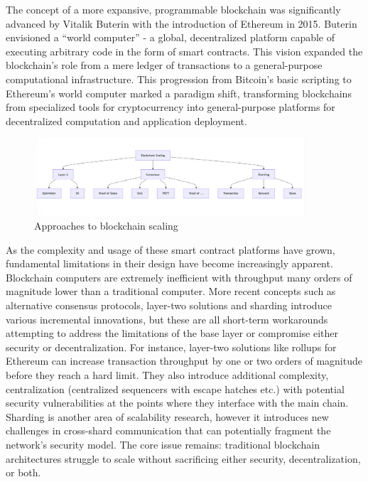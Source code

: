 \documentclass{article}
\begin{document}
The concept of a more expansive, programmable blockchain was significantly advanced by Vitalik Buterin with the introduction of Ethereum in 2015. Buterin envisioned a ``world computer'' - a global, decentralized platform capable of executing arbitrary code in the form of smart contracts. This vision expanded the blockchain's role from a mere ledger of transactions to a general-purpose computational infrastructure. This progression from Bitcoin's basic scripting to Ethereum's world computer marked a paradigm shift, transforming blockchains from specialized tools for cryptocurrency into general-purpose platforms for decentralized computation and application deployment.

\begin{figure}[H]
    \centering
    \includegraphics[width=0.9\textwidth]{scaling.png}
    \caption{Approaches to blockchain scaling}
    \label{fig:scaling}
\end{figure}


As the complexity and usage of these smart contract platforms have grown, fundamental limitations in their design have become increasingly apparent. Blockchain computers are extremely inefficient with throughput many orders of magnitude lower than a traditional computer. More recent concepts such as alternative consensus protocols, layer-two solutions and sharding introduce various incremental innovations, but these are all short-term workarounds attempting to address the limitations of the base layer or compromise either security or decentralization. For instance, layer-two solutions like rollups for Ethereum can increase transaction throughput by one or two orders of magnitude before they reach a hard limit. They also introduce additional complexity, centralization (centralized sequencers with escape hatches etc.) with potential security vulnerabilities at the points where they interface with the main chain. Sharding is another area of scalability research, however it introduces new challenges in cross-shard communication that can potentially fragment the network's security model. The core issue remains: traditional blockchain architectures struggle to scale without sacrificing either security, decentralization, or both.
\end{document}
